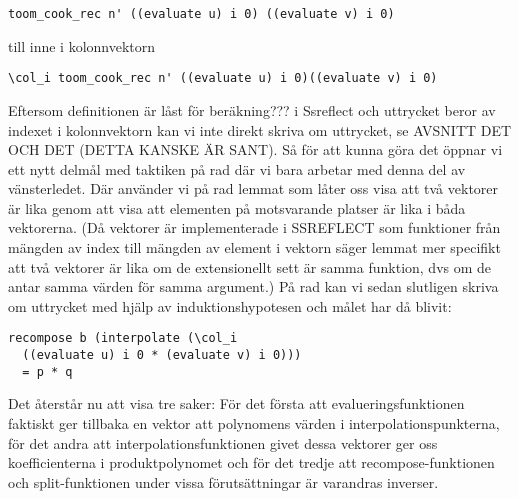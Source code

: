 \begin{lstlisting}
toom_cook_rec n' ((evaluate u) i 0) ((evaluate v) i 0)
\end{lstlisting}
till  inne i kolonnvektorn
\begin{lstlisting}
\col_i toom_cook_rec n' ((evaluate u) i 0)((evaluate v) i 0)
\end{lstlisting}
Eftersom definitionen  är låst för beräkning??? i Ssreflect och
uttrycket beror av indexet  i kolonnvektorn kan vi inte direkt skriva om
uttrycket, se AVSNITT DET OCH DET (DETTA KANSKE ÄR SANT). Så för att kunna göra
det öppnar vi ett nytt delmål med taktiken  på rad  där vi bara
arbetar med denna del av vänsterledet. Där använder vi på rad  lemmat
 som låter oss visa att två vektorer är lika genom att visa att
elementen på motsvarande platser är lika i båda vektorerna. (Då vektorer är
implementerade i SSREFLECT som funktioner från mängden av index till mängden av
element i vektorn säger lemmat mer specifikt att två vektorer är lika om de
extensionellt sett är samma funktion, dvs om de antar samma värden för samma
argument.) På rad  kan vi sedan slutligen skriva om uttrycket med hjälp
av induktionshypotesen och målet har då blivit:
\begin{lstlisting}
recompose b (interpolate (\col_i
  ((evaluate u) i 0 * (evaluate v) i 0)))
  = p * q
\end{lstlisting}
Det återstår nu att visa tre saker: För det första att evalueringsfunktionen
faktiskt ger tillbaka en vektor att polynomens värden i
interpolationspunkterna, för det andra att interpolationsfunktionen givet dessa
vektorer ger oss koefficienterna i produktpolynomet och för det tredje att
recompose-funktionen och split-funktionen under vissa förutsättningar är
varandras inverser.

